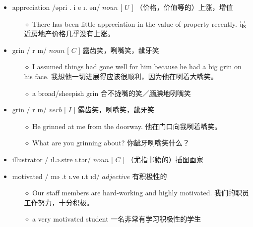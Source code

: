 \documentclass[a4paper,top=2.5cm,buttom=2.5cm10.5pt]{book}
\begin{document}
\begin{itemize}
\item appreciation /ə\textsecstress pri \textlengthmark . \textesh i \textprimstress e \i . \textesh ən/ $ noun $ [  $ U $  ] （价格，价值等的）上涨，增值
\begin{itemize}
\item[$\diamond$] There has been little appreciation in the value of property recently.
最近房地产价格几乎没有上涨。
\end{itemize}
\end{itemize}
\begin{itemize}
\item grin / \textscriptg r \i n/ $ noun $ [  $ C $  ] 露齿笑，咧嘴笑，龇牙笑
\begin{itemize}
\item[$\diamond$] I assumed things had gone well for him because he had a big grin on his face.
我想他一切进展得应该很顺利，因为他在咧着大嘴笑。
\item[$\diamond$] a broad/sheepish grin
合不拢嘴的笑／腼腆地咧嘴笑
\end{itemize}
\end{itemize}
\begin{itemize}
\item grin / \textscriptg r \i n/ $ verb $ [  $ I $  ] 露齿笑，咧嘴笑，龇牙笑
\begin{itemize}
\item[$\diamond$] He grinned at me from the doorway.
他在门口向我咧着嘴笑。
\item[$\diamond$] What are you grinning about?
你龇牙咧嘴笑什么？
\end{itemize}
\end{itemize}
\begin{itemize}
\item illustrator / \textprimstress  \i l.ə.stre \i .tər/ $ noun $ [  $ C $  ] （尤指书籍的）插图画家
\end{itemize}
\begin{itemize}
\item motivated / \textprimstress mə \textupsilon .t \i .ve \i .t \i d/ $ adjective $  有积极性的
\begin{itemize}
\item[$\diamond$] Our staff members are hard-working and highly motivated.
我们的职员工作努力，十分积极。
\item[$\diamond$] a very motivated student
一名非常有学习积极性的学生
\end{itemize}
\end{itemize}
\end{document}
